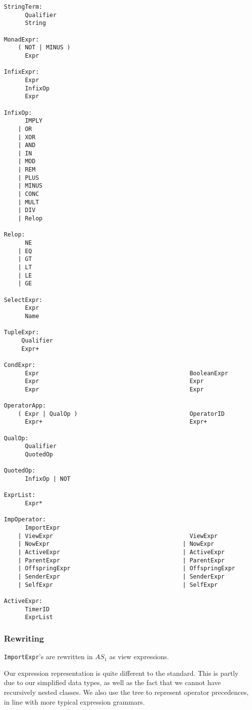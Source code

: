 \begin{verbatim}
StringTerm:
      Qualifier
      String

MonadExpr:
    ( NOT | MINUS )
      Expr

InfixExpr:
      Expr
      InfixOp
      Expr

InfixOp:
      IMPLY
    | OR
    | XOR
    | AND
    | IN
    | MOD
    | REM
    | PLUS
    | MINUS
    | CONC
    | MULT
    | DIV
    | Relop

Relop:
      NE
    | EQ
    | GT
    | LT
    | LE
    | GE

SelectExpr:
      Expr
      Name

TupleExpr:
     Qualifier
     Expr+

CondExpr:
      Expr                                           BooleanExpr
      Expr                                           Expr
      Expr                                           Expr

OperatorApp:
    ( Expr | QualOp )                                OperatorID
      Expr+                                          Expr+

QualOp:
      Qualifier
      QuotedOp

QuotedOp:
      InfixOp | NOT

ExprList:
      Expr*

ImpOperator:
      ImportExpr                                    
    | ViewExpr                                       ViewExpr
    | NowExpr                                      | NowExpr
    | ActiveExpr                                   | ActiveExpr
    | ParentExpr                                   | ParentExpr
    | OffspringExpr                                | OffspringExpr
    | SenderExpr                                   | SenderExpr
    | SelfExpr                                     | SelfExpr

ActiveExpr:
      TimerID
      ExprList
\end{verbatim}

\subsubsection{Rewriting}

{\tt ImportExpr}'s are rewritten in $AS_1$ as view expressions.

Our expression representation is quite different to the standard.
This is partly due to our simplified data types, as well as the
fact that we cannot have recursively nested classes. We also
use the tree to represent operator precedences, in line with more
typical expression grammars.


